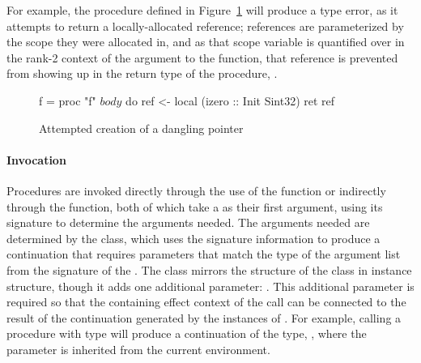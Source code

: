 For example, the procedure  defined in Figure~\ref{fig:proc-def} will
produce a type error, as it attempts to return a locally-allocated reference;
references are parameterized by the scope they were allocated in, and as that
scope variable is quantified over in the rank-2 context of the argument to the
 function, that reference is prevented from showing up in the return
type of the procedure, .

\begin{figure}[h]
\begin{code}
f = proc "f" $ body $ do
  ref <- local (izero :: Init Sint32)
  ret ref
\end{code}
\caption{Attempted creation of a dangling pointer}
\label{fig:proc-def}
\end{figure}

\paragraph{Invocation} Procedures are invoked directly through the use of the
 function or indirectly through the  function, both of which
take a  as their first argument, using its signature to determine the
arguments needed.  The arguments needed are determined by the 
class, which uses the signature information to produce a continuation that
requires parameters that match the type of the argument list from the signature
of the .  The  class mirrors the structure of the
 class in instance structure, though it adds one additional
parameter: .  This additional parameter is required so that the
containing effect context of the call can be connected to the result of the
continuation generated by the instances of .  For example, calling
a procedure with type  will produce a
continuation of the type, , where the 
parameter is inherited from the current environment.

